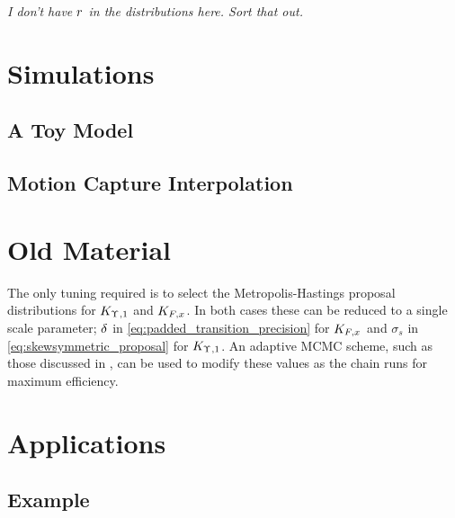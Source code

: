 \documentclass[journal,10pt]{IEEEtran}
\newcommand{\meta}[1]{{\color{red}\em #1}}
\begin{document}
\meta{I don't have $r$ in the distributions here. Sort that out.}











\section{Simulations}

\subsection{A Toy Model}

\subsection{Motion Capture Interpolation}



\section{Old Material}

The only tuning required is to select the Metropolis-Hastings proposal distributions for $K_{\Upsilon_{},1}$ and $K_{F_{},x_{}}$. In both cases these can be reduced to a single scale parameter; $\delta$ in \eqref{eq:padded_transition_precision} for $K_{F_{},x_{}}$ and $\sigma_s$ in \eqref{eq:skewsymmetric_proposal} for $K_{\Upsilon_{},1}$. An adaptive MCMC scheme, such as those discussed in \cite{Roberts2009}, can be used to modify these values as the chain runs for maximum efficiency.






\section{Applications} \label{sec:applications}

\subsection{Example} \label{sec:example_basic}
\end{document}
